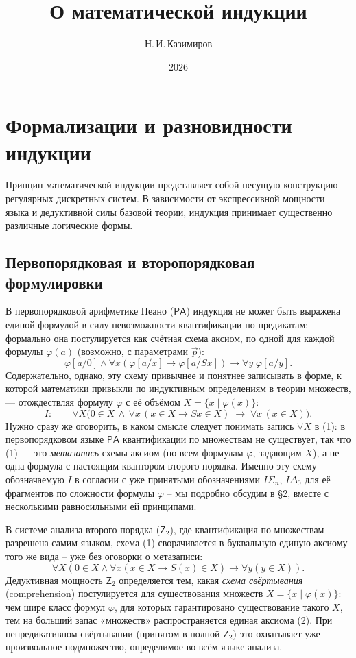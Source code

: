 \documentclass[12pt,a4paper]{article}
\theoremstyle{plain}
\theoremstyle{definition}
\newcommand{\ph}{\varphi}
\newcommand{\toinf}{\rightarrow}
\newcommand{\PA}{\textsf{PA}}
\newcommand{\Ztwo}{\textsf{Z}_2}
\begin{document}
\title{\textbf{О математической индукции}}
\author{Н.\,И.\,Казимиров}
\date{2026}
\maketitle
\tableofcontents
\bigskip

\section{Формализации и разновидности индукции}

Принцип математической индукции представляет собой несущую конструкцию регулярных дискретных систем. В зависимости от экспрессивной мощности языка и дедуктивной силы базовой теории, индукция принимает существенно различные логические формы.

\subsection{Первопорядковая и второпорядковая формулировки}
В первопорядковой арифметике Пеано ($\PA$) индукция не может быть выражена единой формулой в силу невозможности квантификации по предикатам: формально она постулируется как счётная схема аксиом, по одной для каждой формулы $\ph(a)$ (возможно, с параметрами $\vec p$):
$$\ph[a/0] \land \forall x (\ph[a/x] \toinf \ph[a/Sx]) \toinf \forall y \; \ph[a/y].$$
Содержательно, однако, эту схему привычнее и понятнее записывать в форме, к которой математики привыкли по индуктивным определениям в теории множеств, --- отождествляя формулу $\ph$ с её объёмом $X=\{x \mid \ph(x)\}$:
\begin{equation}
    I:\qquad \forall X \Big(0\in X \,\land\, \forall x\,(x\in X \toinf Sx\in X) \;\toinf\; \forall x\,(x\in X)\Big).
\end{equation}
Нужно сразу же оговорить, в каком смысле следует понимать запись $\forall X$ в (1): в первопорядковом языке $\PA$ квантификации по множествам не существует, так что (1) --- это \emph{метазапись} схемы аксиом (по всем формулам $\ph$, задающим $X$), а не одна формула с настоящим квантором второго порядка. Именно эту схему -- обозначаемую $I$ в согласии с уже принятыми обозначениями $I\Sigma_n$, $I\Delta_0$ для её фрагментов по сложности формулы $\ph$ -- мы подробно обсудим в §2, вместе с несколькими равносильными ей принципами.

В системе анализа второго порядка ($\Ztwo$), где квантификация по множествам разрешена самим языком, схема (1) сворачивается в буквальную единую аксиому того же вида -- уже без оговорки о метазаписи:
\begin{equation}
    \forall X \left( 0 \in X \land \forall x (x \in X \toinf S(x) \in X) \toinf \forall y (y \in X) \right).
\end{equation}
Дедуктивная мощность $\Ztwo$ определяется тем, какая \textit{схема свёртывания} (comprehension) постулируется для существования множеств $X = \{x \mid \ph(x)\}$: чем шире класс формул $\ph$, для которых гарантировано существование такого $X$, тем на больший запас «множеств» распространяется единая аксиома (2). При непредикативном свёртывании (принятом в полной $\Ztwo$) это охватывает уже произвольное подмножество, определимое во всём языке анализа.
\end{document}
